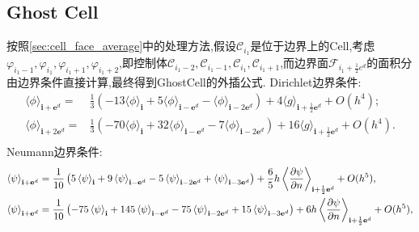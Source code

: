 \documentclass[12pt,halfline,a4paper]{ouparticle}
\begin{document}
\subsection{Ghost Cell}
按照\ref{sec:cell_face_average}中的处理方法,假设$\mathcal{C}_{i_1}$是位于边界上的Cell,考虑$\varphi_{i_1-1},\varphi_{i_1},\varphi_{i_1+1},\varphi_{i_1+2}$,即控制体$\mathcal{C}_{i_1-2},\mathcal{C}_{i_1-1},\mathcal{C}_{i_1},\mathcal{C}_{i_1+1}$,而边界面$\mathcal{F}_{i_1+\frac12 e^d}$的面积分由边界条件直接计算,最终得到GhostCell的外插公式.
\newline
Dirichlet边界条件:
\begin{equation}
\begin{aligned}
 {{\langle\phi\rangle_{\mathbf{i}+\mathbf{e}^{d}}=}} & {{} {{{} \frac{1} {3} \left(-1 3 \langle\phi\rangle_{\mathbf{i}}+5 \langle\phi\rangle_{\mathbf{i}-\mathbf{e}^{d}}-\langle\phi\rangle_{\mathbf{i}-2 \mathbf{e}^{d}} \right)}}}   +4 \langle g \rangle_{\mathbf{i}+\frac{1} {2} \mathbf{e}^{d}}+O ( h^{4} ) ; \\ 
 {{\langle\phi\rangle_{\mathbf{i}+2 \mathbf{e}^{d}}=}} & {{} {{{} \frac{1} {3} \left(-7 0 \langle\phi\rangle_{\mathbf{i}}+3 2 \langle\phi\rangle_{\mathbf{i}-\mathbf{e}^{d}}-7 \langle\phi\rangle_{\mathbf{i}-2 \mathbf{e}^{d}} \right)}}} {{}}  {{} {{} {{}+1 6 \langle g \rangle_{\mathbf{i}+\frac{1} {2} \mathbf{e}^{d}}+O ( h^{4} ).}}} \\  
\end{aligned}
\end{equation}
Neumann边界条件:
\begin{equation}
\begin{aligned} 
    {{\left< \psi\right>_{{\bf i}+{\bf e}^{d}}}} & {{} {{}=\frac{1} {1 0} \left( 5 \left< \psi\right>_{{\bf i}}+9 \left< \psi\right>_{{\bf i}-{\bf e}^{d}}-5 \left< \psi\right>_{{\bf i}-2 {\bf e}^{d}}+\left< \psi\right>_{{\bf i}-3 {\bf e}^{d}} \right)}}  {{}} {{} {{} {}+\frac{6} {5} h \left< \frac{\partial\psi} {\partial n} \right>_{{\bf i}+\frac{1} {2} {\bf e}^{d}}+O ( h^{5} ),}} \\ 
    {{\left< \psi\right>_{{\bf i}+{\bf e}^{d}}}} & {{} {{}=\frac{1} {1 0} \left( -75 \left< \psi\right>_{{\bf i}}+145 \left< \psi\right>_{{\bf i}-{\bf e}^{d}}-75 \left< \psi\right>_{{\bf i}-2 {\bf e}^{d}}+15\left< \psi\right>_{{\bf i}-3 {\bf e}^{d}} \right)}}  {{}} {{} {{} {}+6 h \left< \frac{\partial\psi} {\partial n} \right>_{{\bf i}+\frac{1} {2} {\bf e}^{d}}+O ( h^{5} ),}} \\ 
\end{aligned} 
\end{equation}
\end{document}
